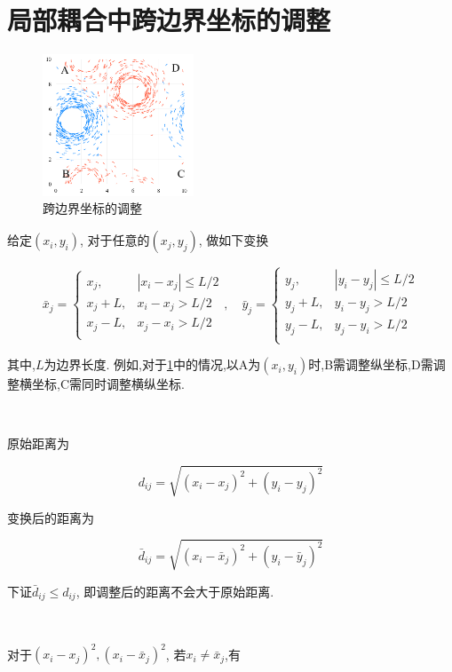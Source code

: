 \documentclass{article}
\begin{document}
\section{局部耦合中跨边界坐标的调整}\label{positionAdj}

\begin{figure}[htbp]
    \centering
    \includegraphics[width=0.4\textwidth]{./figs/fig1.jpg}
    \caption{跨边界坐标的调整}
    \label{fig:fig1}
\end{figure}

给定$(x_i, y_i)$, 对于任意的$(x_j, y_j)$, 做如下变换

\begin{equation}\label{eq:eq1}
	\bar{x}_j=\begin{cases}
		x_j,&		|x_i-x_j|\le L/2\\
		x_j+L,&		x_i-x_j>L/2\\
		x_j-L,&		x_j-x_i>L/2\\
	\end{cases} ,\quad
	\bar{y}_j=\begin{cases}
		y_j,&		|y_i-y_j|\le L/2\\
		y_j+L,&		y_i-y_j>L/2\\
		y_j-L,&		y_j-y_i>L/2\\
	\end{cases}
\end{equation}

其中,$L$为边界长度. 例如,对于\ref{fig:fig1}中的情况,以A为$(x_i, y_i)$时,B需调整纵坐标,D需调整横坐标,C需同时调整横纵坐标.

$\ $

原始距离为

$$
d_{ij}=\sqrt{(x_i-x_j)^2+(y_i-y_j)^2}
$$

变换后的距离为

$$
\bar{d}_{ij}=\sqrt{(x_i-\bar{x}_j)^2+(y_i-\bar{y}_j)^2}
$$

下证$\bar{d}_{ij} \le d_{ij}$, 即调整后的距离不会大于原始距离.

$ $

对于$(x_i-x_j)^2, (x_i-\bar{x}_j)^2$, 若$x_i\ne \bar{x}_j$,有
\end{document}
